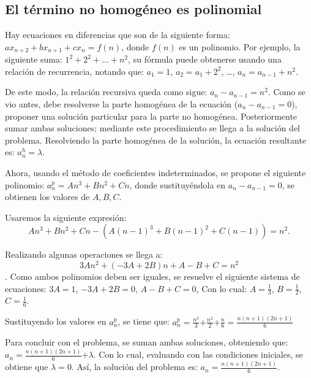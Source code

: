 \documentclass{report}
\begin{document}
\subsection{El término no homogéneo es polinomial}
\label{sec:polinomial}

Hay ecuaciones en diferencias que son de la siguiente forma: $ax_{n+2}+bx_{n+1}+cx_n=f(n)$, donde $f(n)$ es un polinomio. Por ejemplo, la siguiente suma: $1^2+2^2+...+n^2$, su fórmula puede obtenerse usando una relación de recurrencia, notando que:
$a_1=1$, $a_2=a_1+2^2$, \dots, $a_n=a_{n-1}+n^2$.


De este modo, la relación recursiva queda como sigue:
$a_{n}-a_{n-1}=n^2$.  Como se vio antes, debe resolverse la parte
homogénea de la ecuación ($a_n-a_{n-1}=0$), proponer una solución
particular para la parte no homogénea. Posteriormente sumar ambas
soluciones; mediante este procedimiento se llega a la solución del problema.
Resolviendo la parte homogénea de la solución, la ecuación resultante
es: $a^h_n=\lambda$.

Ahora, usando el método de coeficientes indeterminados, se propone el
siguiente polinomio: $a^p_n=An^3+Bn^2+Cn$, donde sustituyéndola en
$a_n-a_{n-1}=0$, se obtienen los valores de $A,B,C$.

Usaremos la siguiente expresión:
\begin{equation}
  \label{polinomial}
   An^3+Bn^2+Cn-(A(n-1)^3+B(n-1)^2+C(n-1))=n^2.  
\end{equation}

Realizando algunas operaciones se llega a:
$$3An^2+(-3A+2B)n+A-B+C=n^2$$.
Como ambos polinomios deben ser iguales, se resuelve el siguiente sistema de ecuaciones:
$3A=1$,
$-3A+2B=0$,
$A-B+C=0$,
Con lo cual: $A=\frac{1}{3}$, $B=\frac{1}{2}$, $C=\frac{1}{6}$.

Sustituyendo los valores en $a^p_n$, se tiene que:
$a^p_n=\frac{n^3}{3}$$+\frac{n^2}{2}$$+\frac{n}{6}=$$\frac{n(n+1)(2n+1)}{6}$

Para concluir con el problema, se suman ambas soluciones, obteniendo que:
$a_n=\frac{n(n+1)(2n+1)}{6}$$+\lambda$.
Con lo cual, evaluando con las condiciones iniciales, se obtiene que $\lambda$$=0$.
Así, la solución del problema es:
$a_n=\frac{n(n+1)(2n+1)}{6}$.
\end{document}
